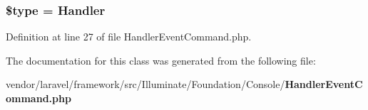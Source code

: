 \subsubsection[{\$type}]{\setlength{\rightskip}{0pt plus 5cm}\$type = \textquotesingle{}Handler\textquotesingle{}\hspace{0.3cm}{\ttfamily [protected]}}\label{class_illuminate_1_1_foundation_1_1_console_1_1_handler_event_command_a9a4a6fba2208984cabb3afacadf33919}


Definition at line 27 of file Handler\+Event\+Command.\+php.



The documentation for this class was generated from the following file\+:\begin{DoxyCompactItemize}
\item 
vendor/laravel/framework/src/\+Illuminate/\+Foundation/\+Console/{\bf Handler\+Event\+Command.\+php}\end{DoxyCompactItemize}

